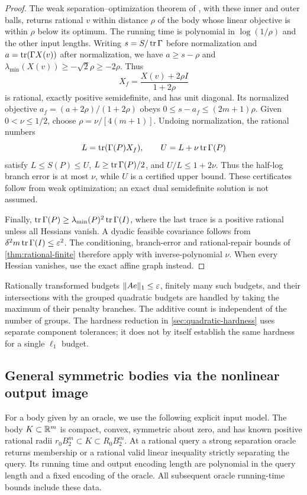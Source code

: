 \begin{proof}
The weak separation--optimization theorem of
\citet[Definition (5) and Theorem (3.1)]{gls1981}, with these inner and
outer balls, returns rational $v$ within distance $\rho$ of the body
whose linear objective is within $\rho$ below its optimum. The running
time is polynomial in $\log(1/\rho)$ and the other input lengths.
Writing $s=S/\operatorname{tr}\Gamma$ before normalization and
$a=\operatorname{tr}(\Gamma X(v))$ after normalization, we have
$a\ge s-\rho$ and $\lambda_{\min}(X(v))\ge-\sqrt2\rho\ge-2\rho$.
Thus
\begin{equation}\label{eq:correlation-repair}
 X_f=\frac{X(v)+2\rho I}{1+2\rho}
\end{equation}
is rational, exactly positive semidefinite, and has unit diagonal.
Its normalized objective $a_f=(a+2\rho)/(1+2\rho)$ obeys
$0\le s-a_f\le(2m+1)\rho$. Given $0<\nu\le1/2$, choose
$\rho=\nu/[4(m+1)]$. Undoing normalization, the rational numbers
\[
 L=\operatorname{tr}(\Gamma(P)X_f),\qquad U=L+\nu\operatorname{tr}\Gamma(P)
\]
satisfy $L\le S(P)\le U$, $L\ge\operatorname{tr}\Gamma(P)/2$, and $U/L\le1+2\nu$.
Thus the half-log branch error is at most $\nu$, while $U$ is a
certified upper bound. These certificates follow from weak optimization;
an exact dual semidefinite solution is not assumed.

Finally, $\operatorname{tr}\Gamma(P)\ge\lambda_{\min}(P)^2\operatorname{tr}\Gamma(I)$, where the
last trace is a positive rational unless all Hessians vanish. A dyadic
feasible covariance follows from
$\delta^2m\operatorname{tr}\Gamma(I)\le\varepsilon^2$. The conditioning, branch-error and
rational-repair bounds of \cref{thm:rational-finite} therefore apply with
inverse-polynomial $\nu$. When every Hessian vanishes, use the exact
affine graph instead.
\end{proof}

Rationally transformed budgets $\|Ae\|_1\le\varepsilon$, finitely many such
budgets, and their intersections with the grouped quadratic budgets are
handled by taking the maximum of their penalty branches. The additive
count is independent of the number of groups. The hardness reduction
in \cref{sec:quadratic-hardness} uses separate component tolerances;
it does not by itself establish the same hardness for a single
$\ell_1$ budget.

\subsection{General symmetric bodies via the nonlinear output image}

For a body given by an oracle, we use the following explicit input model.
The body $K\subset\mathbb R^m$ is compact, convex, symmetric about zero, and
has known positive rational radii
$r_0B_2^m\subset K\subset R_0B_2^m$. At a rational query a strong
separation oracle returns membership or a rational valid linear inequality
strictly separating the query. Its running time and output encoding length
are polynomial in the query length and a fixed encoding of the oracle.
All subsequent oracle running-time bounds include these data.

